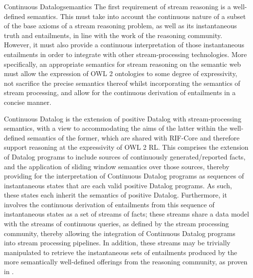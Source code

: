 \begin{nestedsection}{Continuous Datalog}{semantics}
	The first requirement of stream reasoning is a well-defined semantics.
	This must take into account the continuous nature of a subset of the base axioms of a stream reasoning problem, as well as its instantaneous truth and entailments, in line with the work of the reasoning community.
	However, it must also provide a continuous interpretation of those instantaneous entailments in order to integrate with other stream-processing technologies.
	More specifically, an appropriate semantics for stream reasoning on the semantic web must allow the expression of OWL 2 ontologies to some degree of expressivity, not sacrifice the precise semantics thereof whilst incorporating the semantics of stream processing, and allow for the continuous derivation of entailments in a concise manner.

	Continuous Datalog is the extension of positive Datalog with stream-processing semantics, with a view to accommodating the aims of the latter within the well-defined semantics of the former, which are shared with RIF-Core and therefore support reasoning at the expressivity of OWL 2 RL.
	This comprises the extension of Datalog programs to include sources of continuously generated/reported facts, and the application of sliding window semantics over those sources, thereby providing for the interpretation of Continuous Datalog programs as sequences of instantaneous states that are each valid positive Datalog programs.
	As such, these states each inherit the semantics of positive Datalog.
	Furthermore, it involves the continuous derivation of entailments from this sequence of instantaneous states as a set of streams of facts;
	these streams share a data model with the streams of continuous queries, as defined by the stream processing community, thereby allowing the integration of Continuous Datalog programs into stream processing pipelines.
	In addition, these streams may be trivially manipulated to retrieve the instantaneous sets of entailments produced by the more semantically well-defined offerings from the reasoning community, as proven in .


\end{nestedsection}
